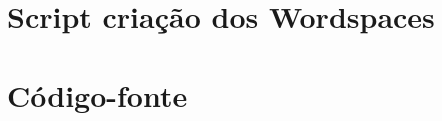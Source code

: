 \documentclass[12pt,openright,twoside,a4paper,article,brazil]{abntex2}
\begin{document}
\chapter{Script criação dos Wordspaces}
\label{sec:ap-wordspaces}



\chapter{Código-fonte}
\label{sec:ap-wordanalogy2}


\end{document}
